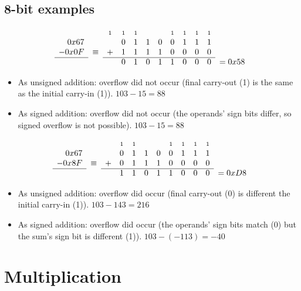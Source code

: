 \documentclass{article}
\newcommand{\carry}{\scriptstyle 1}
\begin{document}
\subsection{8-bit examples}

\begin{equation*}\begin{array}{rccccccccccl}
       &        & \carry & \carry & \carry &   &   & \carry & \carry & \carry & \carry & \\
  0x67 &        &   & 0 & 1 & 1 & 0 & 0 & 1 & 1 & 1 & \\
- 0x0F & \equiv & + & 1 & 1 & 1 & 1 & 0 & 0 & 0 & 0 & \\ \cline{1-1}\cline{3-11}
       &        &   & 0 & 1 & 0 & 1 & 1 & 0 & 0 & 0 & = 0x58
\end{array}\end{equation*}

\begin{itemize}
\item As unsigned addition: overflow did not occur (final carry-out (1) is the
    same as the initial carry-in (1)). $103-15=88$
\item As signed addition: overflow did not occur (the operands' sign bits
    differ, so signed overflow is not possible). $103-15=88$
\end{itemize}

\begin{equation*}\begin{array}{rccccccccccl}
       &        &   & \carry & \carry &   &   & \carry & \carry & \carry & \carry & \\
  0x67 &        &   & 0 & 1 & 1 & 0 & 0 & 1 & 1 & 1 & \\
- 0x8F & \equiv & + & 0 & 1 & 1 & 1 & 0 & 0 & 0 & 0 & \\ \cline{1-1}\cline{3-11}
       &        &   & 1 & 1 & 0 & 1 & 1 & 0 & 0 & 0 & = 0xD8
\end{array}\end{equation*}

\begin{itemize}
\item As unsigned addition: overflow did occur (final carry-out (0) is
    different the initial carry-in (1)). $103-143=216$
\item As signed addition: overflow did occur (the operands' sign bits match (0)
    but the sum's sign bit is different (1)). $103-(-113)=-40$
\end{itemize}


\section{Multiplication}
\end{document}

